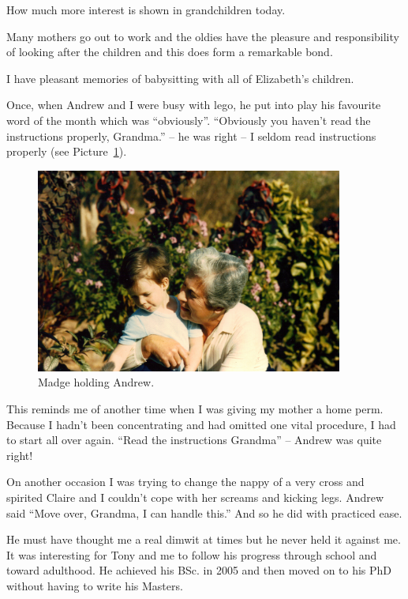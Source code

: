 How much more interest is shown in grandchildren today.

Many mothers go out to work and the oldies have the pleasure and
responsibility of looking after the children and this does form a
remarkable bond.

I have pleasant memories of babysitting with all of Elizabeth's
children.

Once, when Andrew and I were busy with lego, he put into play his
favourite word of the month which was ``obviously''. ``Obviously you
haven't read the instructions properly, Grandma.'' -- he was right --
I seldom read instructions properly (see Picture~\ref{madge-and-andrew}).

\begin{figure}
  \centering
  \includegraphics[width=0.9\textwidth]{photos/madge-and-andrew.jpg}
  \caption{Madge holding Andrew.}
  \label{madge-and-andrew}
\end{figure}

This reminds me of another time when I was giving my mother a home
perm. Because I hadn't been concentrating and had omitted one vital
procedure, I had to start all over again. ``Read the instructions
Grandma'' -- Andrew was quite right!

On another occasion I was trying to change the nappy of a very cross
and spirited Claire and I couldn't cope with her screams and kicking
legs. Andrew said ``Move over, Grandma, I can handle this.'' And so he
did with practiced ease.

He must have thought me a real dimwit at times but he never held it
against me. It was interesting for Tony and me to follow his progress
through school and toward adulthood. He achieved his BSc. in 2005 and
then moved on to his PhD without having to write his Masters.

